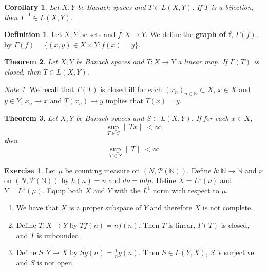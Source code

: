 \documentclass[12pt]{amsart}
\newtheorem{thm}{Theorem}[subsection]
\newtheorem{cor}[thm]{Corollary}
\theoremstyle{definition}
\newtheorem{defn}[definition]{Definition}
\theoremstyle{remark}
\newtheorem{note}[remark]{Note}
\theoremstyle{definition}
\newtheorem{ex}[definition]{Exercise}
\newcommand{\Gam}{\Gamma}
\newcommand{\N}{\mathbb{N}}
\newcommand{\MP}{\mathcal{P}}
\newcommand{\conv}[1]{\xrightarrow{#1}}
\begin{document}
	\begin{cor}
		Let $X, Y$ be Banach spaces and $T \in L(X,Y)$. If $T$ is a bijection, then $T^{-1} \in L(X,Y)$.
	\end{cor}
	
	\begin{defn}
		Let $X,Y$ be sets and $f:X \rightarrow Y$. We define the \textbf{graph of f}, $\Gam(f)$, by $\Gam(f) = \{(x,y) \in X \times Y: f(x) = y\}$.
	\end{defn}
	
	\begin{thm}
		Let $X, Y$ be Banach spaces and $T:X \rightarrow Y$ a linear map. If $\Gam(T)$ is closed, then $T \in L(X,Y)$.  
	\end{thm}
	
	\begin{note}
		We recall that $\Gam(T)$ is closed iff for each $(x_n)_{n \in \N} \subset X$, $x \in X$ and $y \in Y$, $x_n \conv{} x$ and $T(x_n) \conv{} y$ implies that $T(x) = y$. 
	\end{note}
	
	\begin{thm}
		
		Let $X, Y$ be Banach spaces and $S \subset L(X,Y)$. If for each $x \in X$, $$\sup_{T \in S} \|Tx \|< \infty$$ then $$\sup_{T \in S} \|T \|< \infty$$
	\end{thm}
	
	\begin{ex}
		Let $\mu$ be counting measure on $(N, \MP(\N))$. Define $h: \N \rightarrow \N$ and $ \nu$ on $(N, \MP(\N))$ by $h(n) = n$ and $d \nu = h d \mu$. Define $X=L^1(\nu)$ and $Y = L^1(\mu)$. Equip both $X$ and $Y$ with the $L^1$ norm with respect to $\mu$. 
		\begin{enumerate}
			\item We have that $X$ is a proper subspace of $Y$ and therefore $X$ is not complete.
			\item Define $T: X \rightarrow Y$ by $Tf(n) = nf(n)$. Then $T$ is linear, $\Gam(T)$ is closed, and $T$ is unbounded.
			\item Define $S:Y \rightarrow X$ by $Sg(n) = \frac{1}{n}g(n)$. Then $S \in L(Y,X)$, $S$ is surjective and $S$ is not open. 
		\end{enumerate}
	\end{ex}
	
\end{document}

